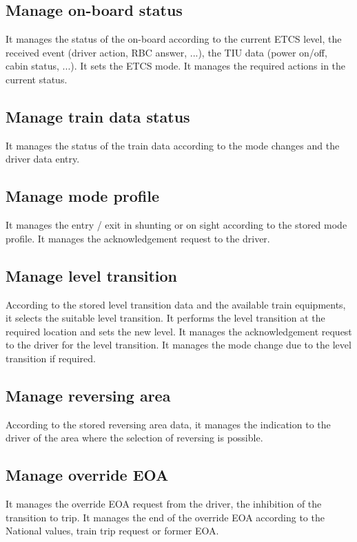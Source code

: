 \documentclass[nocc]{template/openetcs_report}
\begin{document}
\subsection{Manage on-board status}
It manages the status of the on-board according to the current ETCS level, the received event (driver action, RBC answer, ...), the TIU data (power on/off, cabin status, ...). 
It sets the ETCS mode. 
It manages the required actions in the current status.

\subsection{Manage train data status}
It manages the status of the train data according to the mode changes and the driver data entry.

\subsection{Manage mode profile}
It manages the entry / exit in shunting or on sight according to the stored mode profile. 
It manages the acknowledgement request to the driver.

\subsection{Manage level transition}
According to the stored level transition data and the available train equipments, it selects the suitable level transition. 
It performs the level transition at the required location and sets the new level. 
It manages the acknowledgement request to the driver for the level transition. 
It manages the mode change due to the level transition if required.

\subsection{Manage reversing area}
According to the stored reversing area data, it manages the indication to the driver of the area where the selection of reversing is possible.

\subsection{Manage override EOA}
It manages the override EOA request from the driver, the inhibition of the transition to trip. 
It manages the end of the override EOA according to the National values, train trip request or former EOA.
\end{document}
